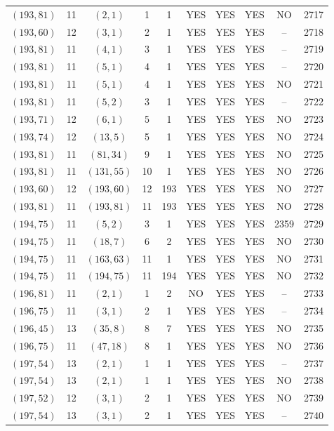 \begin{longtable}{|c|c|c|c|c|c|c|c|c|c|}
$(193, 81)$ & 11 & $(2, 1)$ & 1 & 1 & YES & YES & YES & NO & 2717\\
$(193, 60)$ & 12 & $(3, 1)$ & 2 & 1 & YES & YES & YES & -- & 2718\\
$(193, 81)$ & 11 & $(4, 1)$ & 3 & 1 & YES & YES & YES & -- & 2719\\
$(193, 81)$ & 11 & $(5, 1)$ & 4 & 1 & YES & YES & YES & -- & 2720\\
$(193, 81)$ & 11 & $(5, 1)$ & 4 & 1 & YES & YES & YES & NO & 2721\\
$(193, 81)$ & 11 & $(5, 2)$ & 3 & 1 & YES & YES & YES & -- & 2722\\
$(193, 71)$ & 12 & $(6, 1)$ & 5 & 1 & YES & YES & YES & NO & 2723\\
$(193, 74)$ & 12 & $(13, 5)$ & 5 & 1 & YES & YES & YES & NO & 2724\\
$(193, 81)$ & 11 & $(81, 34)$ & 9 & 1 & YES & YES & YES & NO & 2725\\
$(193, 81)$ & 11 & $(131, 55)$ & 10 & 1 & YES & YES & YES & NO & 2726\\
$(193, 60)$ & 12 & $(193, 60)$ & 12 & 193 & YES & YES & YES & NO & 2727\\
$(193, 81)$ & 11 & $(193, 81)$ & 11 & 193 & YES & YES & YES & NO & 2728\\
$(194, 75)$ & 11 & $(5, 2)$ & 3 & 1 & YES & YES & YES & 2359 & 2729\\
$(194, 75)$ & 11 & $(18, 7)$ & 6 & 2 & YES & YES & YES & NO & 2730\\
$(194, 75)$ & 11 & $(163, 63)$ & 11 & 1 & YES & YES & YES & NO & 2731\\
$(194, 75)$ & 11 & $(194, 75)$ & 11 & 194 & YES & YES & YES & NO & 2732\\
$(196, 81)$ & 11 & $(2, 1)$ & 1 & 2 & NO & YES & YES & -- & 2733\\
$(196, 75)$ & 11 & $(3, 1)$ & 2 & 1 & YES & YES & YES & -- & 2734\\
$(196, 45)$ & 13 & $(35, 8)$ & 8 & 7 & YES & YES & YES & NO & 2735\\
$(196, 75)$ & 11 & $(47, 18)$ & 8 & 1 & YES & YES & YES & NO & 2736\\
$(197, 54)$ & 13 & $(2, 1)$ & 1 & 1 & YES & YES & YES & -- & 2737\\
$(197, 54)$ & 13 & $(2, 1)$ & 1 & 1 & YES & YES & YES & NO & 2738\\
$(197, 52)$ & 12 & $(3, 1)$ & 2 & 1 & YES & YES & YES & NO & 2739\\
$(197, 54)$ & 13 & $(3, 1)$ & 2 & 1 & YES & YES & YES & -- & 2740\\

\end{longtable}
